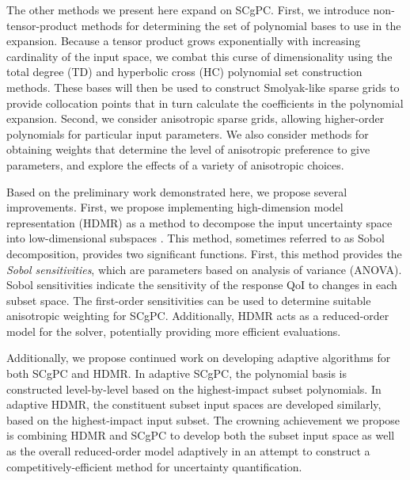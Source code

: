 The other methods we present here expand on
SCgPC.  First, we introduce non-tensor-product methods for determining the set of polynomial bases to
use in the expansion.  Because a tensor product grows exponentially with increasing cardinality of the input
space, we combat this curse of dimensionality using the 
total degree (TD) and hyperbolic cross (HC) polynomial set construction methods\cite{hctd}.
These bases will then be used to construct Smolyak-like sparse grids \cite{smolyak} to provide collocation
points that in turn calculate the coefficients in the polynomial expansion.  Second, we consider
anisotropic sparse grids,
allowing higher-order polynomials for particular input parameters.  We also consider methods for
obtaining weights that determine the level of anisotropic preference to give parameters, and explore the effects of a
variety of anisotropic choices.


Based on the preliminary work demonstrated here, we propose several improvements.  First, we propose
implementing high-dimension model representation (HDMR) as a method to decompose the input uncertainty space
into low-dimensional subspaces \cite{hdmr}.  This method, sometimes referred to as Sobol decomposition,
provides two significant functions.  First, this method provides the \emph{Sobol sensitivities}, which are
parameters based on analysis of variance (ANOVA).  Sobol sensitivities indicate the sensitivity of the
response QoI to changes in each subset space.  The first-order sensitivities can be used to determine suitable
anisotropic weighting for SCgPC.  Additionally, HDMR acts as a reduced-order model for the solver, potentially
providing more efficient evaluations.

Additionally, we propose continued work on developing adaptive algorithms for both SCgPC and HDMR\cite{Ayres}.  In adaptive
SCgPC, the polynomial basis is constructed level-by-level based on the highest-impact subset polynomials.  In
adaptive HDMR, the constituent subset input spaces are developed similarly, based on the highest-impact input
subset.  The crowning achievement we propose is combining HDMR and SCgPC to develop both the subset input
space as well as the overall reduced-order model adaptively in an attempt to construct a
competitively-efficient method for uncertainty quantification.

